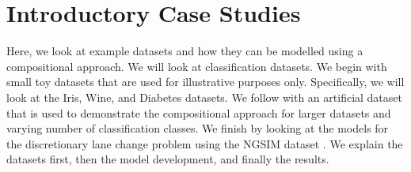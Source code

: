 \chapter{Introductory Case Studies} \label{chapter:motivation}
\glsresetall


Here, we look at example datasets and how they can be modelled using a compositional approach. We will look at classification datasets. We begin with small toy datasets that are used for illustrative purposes only. Specifically, we will look at the Iris, Wine, and Diabetes datasets. We follow with an artificial dataset that is used to demonstrate the compositional approach for larger datasets and varying number of classification classes. We finish by looking at the models for the discretionary lane change problem using the NGSIM dataset \cite{administration_next_2016}. We explain the datasets first, then the model development, and finally the results.











